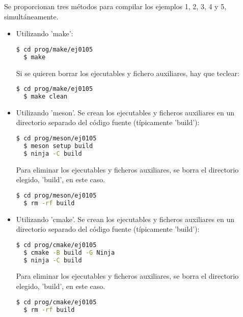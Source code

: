 Se proporcionan tres métodos para compilar los ejemplos 1, 2, 3, 4 y 5, simultáneamente.
\begin{itemize}
  \tightlist
\item Utilizando 'make':
\begin{lstlisting}[language=bash]
  $ cd prog/make/ej0105
  $ make
\end{lstlisting}
Si se quieren borrar los ejecutables y fichero auxiliares, hay que teclear:
\begin{lstlisting}[language=bash]
  $ cd prog/make/ej0105
  $ make clean
\end{lstlisting}
\item Utilizando 'meson'.
  Se crean los ejecutables y ficheros auxiliares en un directorio separado del código fuente
  (típicamente 'build'):
\begin{lstlisting}[language=bash]
  $ cd prog/meson/ej0105
  $ meson setup build
  $ ninja -C build
\end{lstlisting}
Para eliminar los ejecutables y ficheros auxiliares, se borra el directorio elegido, 'build', en este caso.
\begin{lstlisting}[language=bash]
  $ cd prog/meson/ej0105
  $ rm -rf build
\end{lstlisting}
\item Utilizando 'cmake'.
  Se crean los ejecutables y ficheros auxiliares en un directorio separado del código fuente
  (típicamente 'build'):
\begin{lstlisting}[language=bash]
  $ cd prog/cmake/ej0105
  $ cmake -B build -G Ninja
  $ ninja -C build
\end{lstlisting}
Para eliminar los ejecutables y ficheros auxiliares, se borra el directorio elegido, 'build', en este caso.
\begin{lstlisting}[language=bash]
  $ cd prog/cmake/ej0105
  $ rm -rf build
\end{lstlisting}
\end{itemize}

